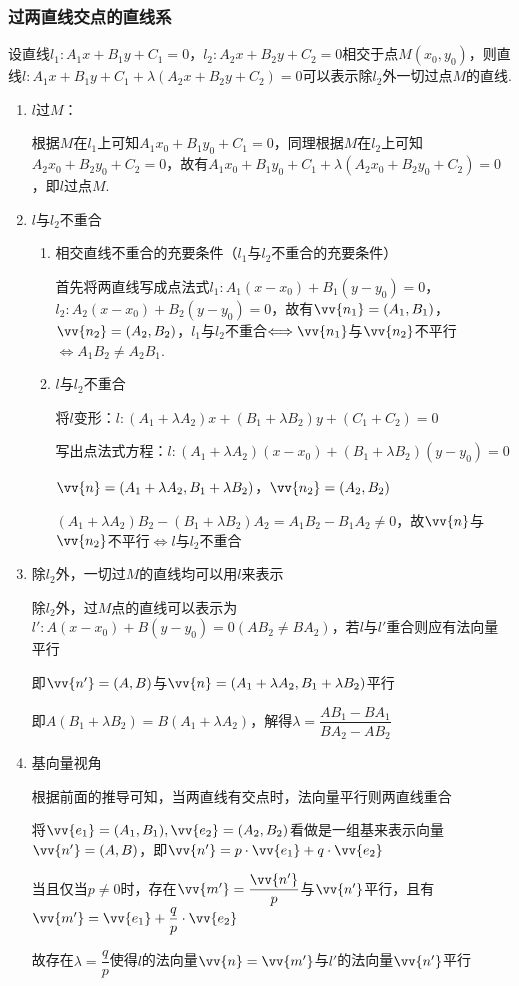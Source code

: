 \subsubsection*{过两直线交点的直线系}
设直线$l_1: A_1x+B_1y+C_1=0$，$l_2: A_2x+B_2y+C_2=0$相交于点$M(x_0, y_0)$，则直线$l: A_1x+B_1y+C_1 + \lambda(A_2x+B_2y+C_2) = 0$可以表示除$l_2$外一切过点$M$的直线.

\begin{enumerate}
    \item $l$过$M$：
    
    根据$M$在$l_1$上可知$A_1x_0+B_1y_0+C_1=0$，同理根据$M$在$l_2$上可知$A_2x_0+B_2y_0+C_2=0$，故有$A_1x_0+B_1y_0+C_1 + \lambda(A_2x_0+B_2y_0+C_2) = 0$，即$l$过点$M$.

    \item $l$与$l_2$不重合
    \begin{enumerate}
        \item 相交直线不重合的充要条件（$l_1$与$l_2$不重合的充要条件）

        首先将两直线写成点法式$l_1: A_1(x-x_0)+B_1(y-y_0) = 0$，$l_2: A_2(x-x_0)+B_2(y-y_0) = 0$，故有$\vv{n_1} = (A_1, B_1)$，$\vv{n_2} = (A_2, B_2)$，$l_1$与$l_2$不重合$\Longleftrightarrow \vv{n_1}$与$\vv{n_2}$不平行$\Longleftrightarrow A_1B_2 \neq A_2B_1$.

        \item $l$与$l_2$不重合

        将$l$变形：$l: (A_1+\lambda A_2)x+(B_1+\lambda B_2)y + (C_1+C_2) = 0$
        
        写出点法式方程：$l: (A_1+\lambda A_2)(x-x_0)+(B_1+\lambda B_2)(y-y_0) = 0$

        $\vv{n} = (A_1+\lambda A_2, B_1+\lambda B_2)$，$\vv{n_2} = (A_2, B_2)$
        
        $(A_1+\lambda A_2)B_2 - (B_1+\lambda B_2)A_2 = A_1B_2-B_1A_2 \neq 0$，故$\vv{n}$与$\vv{n_2}$不平行$\Longleftrightarrow l$与$l_2$不重合
    \end{enumerate}
    \item 除$l_2$外，一切过$M$的直线均可以用$l$来表示

    除$l_2$外，过$M$点的直线可以表示为$l': A(x-x_0)+B(y-y_0) = 0 (AB_2 \neq BA_2)$，若$l$与$l'$重合则应有法向量平行
    
    即$\vv{n'} = (A, B)$与$\vv{n} = (A_1+\lambda A_2, B_1+\lambda B_2)$平行
    
    即$A(B_1+\lambda B_2) = B(A_1+\lambda A_2)$，解得$\lambda = \dfrac{AB_1-BA_1}{BA_2-AB_2}$

    \item 基向量视角

    根据前面的推导可知，当两直线有交点时，法向量平行则两直线重合
    
    将$\vv{e_1} = (A_1, B_1), \vv{e_2} = (A_2, B_2)$看做是一组基来表示向量$\vv{n'} = (A, B)$，即$\vv{n'} = p \cdot \vv{e_1} + q \cdot \vv{e_2}$
    
    当且仅当$p \neq 0$时，存在$\vv{m'} = \dfrac{\vv{n'}}{p}$与$\vv{n'}$平行，且有$\vv{m'} = \vv{e_1} + \dfrac{q}{p} \cdot \vv{e_2}$
    
    故存在$\lambda = \dfrac{q}{p}$使得$l$的法向量$\vv{n} = \vv{m'}$与$l'$的法向量$\vv{n'}$平行
\end{enumerate}

